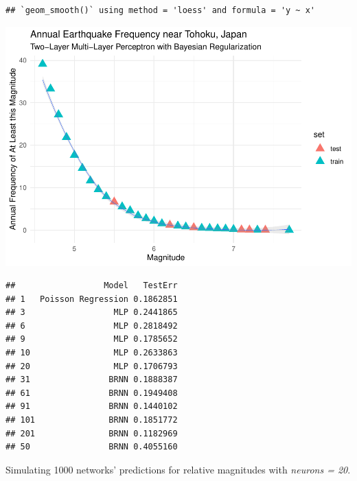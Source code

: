 \begin{verbatim}
## `geom_smooth()` using method = 'loess' and formula = 'y ~ x'
\end{verbatim}

\includegraphics{Appendix_eq_files/figure-latex/unnamed-chunk-14-1.pdf}

\begin{Shaded}
\begin{Highlighting}[]
\end{Highlighting}
\end{Shaded}

\begin{verbatim}
##                  Model   TestErr
## 1   Poisson Regression 0.1862851
## 3                  MLP 0.2441865
## 6                  MLP 0.2818492
## 9                  MLP 0.1785652
## 10                 MLP 0.2633863
## 20                 MLP 0.1706793
## 31                BRNN 0.1888387
## 61                BRNN 0.1949408
## 91                BRNN 0.1440102
## 101               BRNN 0.1851772
## 201               BRNN 0.1182969
## 50                BRNN 0.4055160
\end{verbatim}


Simulating 1000 networks' predictions for relative magnitudes with
\emph{neurons = 20}.

